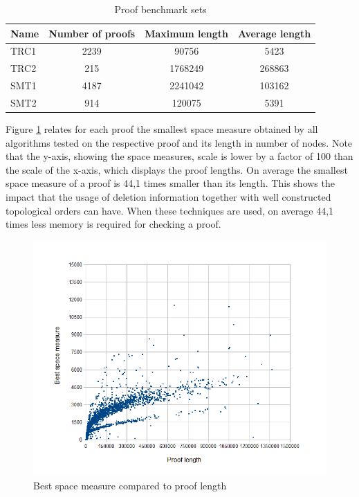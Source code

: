 \documentclass{llncs}
\begin{document}
\begin{table}[tb]
	\centering
	\setlength{\tabcolsep}{8pt}
	\begin{tabular}{|l|c|c|c|}
		\hline
		\textbf{Name} & \textbf{Number of proofs} & \textbf{Maximum length} & \textbf{Average length} \\ 
		\hline \hline
		TRC1 & 2239 & 90756   & 5423   \\ \hline
		TRC2 & 215	& 1768249 & 268863 \\ \hline
    SMT1 & 4187 & 2241042 & 103162 \\ \hline
    SMT2 & 914  & 120075  & 5391  \\ 
		\hline   
	\end{tabular}
	\caption{Proof benchmark sets}
	\label{tab:benchmarks}
\end{table}

Figure \ref{fig:SpaceVSLength} relates for each proof the smallest space measure obtained by all algorithms tested on the respective proof and its length in number of nodes. Note that the y-axis, showing the space measures, scale is lower by a factor of 100 than the scale of the x-axis, which displays the proof lengths. On average the smallest space measure of a proof is 44,1 times smaller than its length. This shows the impact that the usage of deletion information together with well constructed topological orders can have. When these techniques are used, on average 44,1 times less memory is required for checking a proof.

\begin{figure}[tb]
	\centering
	\includegraphics[scale=0.5]{Figures/length_vs_space_2.png}
	\caption{Best space measure compared to proof length}
	\label{fig:SpaceVSLength}
\end{figure}
\end{document}

